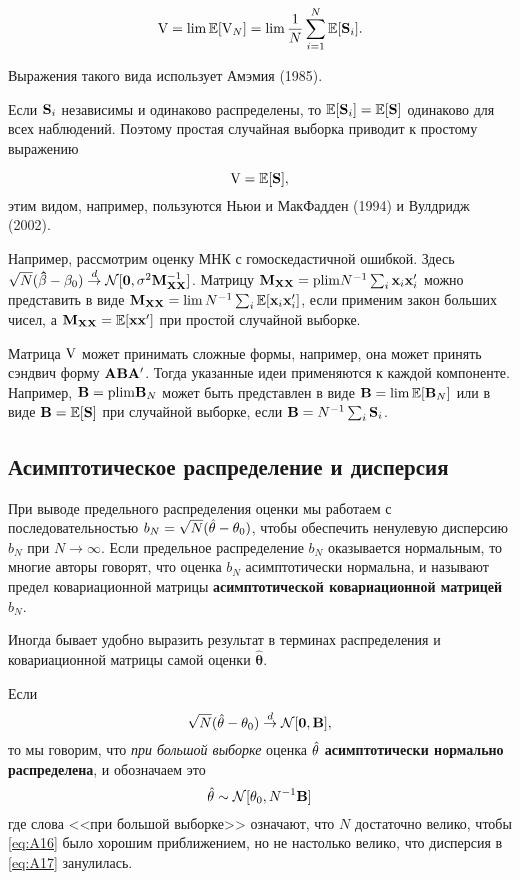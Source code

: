 \[
\mathbf{\mathrm{V}} = \lim \mathbb{E}[\mathbf{\mathrm{V}}_N] = \lim \frac{1}{N} \sum_{i=1}^{N} \mathbb{E}[\mathbf{S}_i].
\]

Выражения такого вида использует Амэмия (1985).

Если $\mathbf{S}_i$ независимы и одинаково распределены, то $\mathbb{E}[\mathbf{S}_i]=\mathbb{E}[\mathbf{S}]$ одинаково для всех наблюдений. Поэтому простая случайная выборка приводит к простому выражению 

\[
\mathbf{\mathrm{V}} = \mathbb{E}[\mathbf{S}],
\]
этим видом, например, пользуются Ньюи и МакФадден (1994) и Вулдридж (2002).

Например, рассмотрим оценку МНК с гомоскедастичной ошибкой. Здесь $\sqrt{N}(\mathbf{\hat{\beta}}-\mathbf{\beta}_0) \overset{d}{\to} \mathcal{N} [\mathbf{0},\sigma^2 \mathbf{M}^{-1}_{\mathbf{XX}}]$. Матрицу $\mathbf{M}_{\mathbf{XX}}=\mathrm{plim } N^{-1} \sum_i \mathbf{x}_i\mathbf{x}_i'$ можно представить в виде $\mathbf{M}_{\mathbf{XX}} = \lim N^{-1} \sum_i \mathbb{E}[\mathbf{x}_i\mathbf{x}_i']$, если применим закон больших чисел, а $\mathbf{M}_{\mathbf{XX}}=\mathbb{E}[\mathbf{x}\mathbf{x}']$ при простой случайной выборке.

Матрица $\mathbf{\mathrm{V}}$ может принимать сложные формы, например, она может принять сэндвич форму $\mathbf{A}\mathbf{B}\mathbf{A}'$. Тогда указанные идеи применяются к каждой компоненте. Например, $\mathbf{B} = \mathrm{plim } \mathbf{B}_N$ может быть представлен в виде $\mathbf{B} = \lim \mathbb{E}[\mathbf{B}_N]$ или в виде $\mathbf{B}=\mathbb{E}[\mathbf{S}]$ при случайной выборке, если $\mathbf{B}=N^{-1}\sum_i \mathbf{S}_i$.

\subsection{Асимптотическое распределение и дисперсия}

При выводе предельного распределения оценки мы работаем с последовательностью $b_N=\sqrt{N}(\hat{\theta}-\theta_0)$, чтобы обеспечить ненулевую дисперсию $b_N$ при $N\to\infty$. Если предельное распределение $b_N$ оказывается нормальным, то многие авторы говорят, что оценка $b_N$ асимптотически нормальна, и называют предел ковариационной матрицы \textbf{асимптотической ковариационной матрицей} $b_N$.

Иногда бывает удобно выразить результат в терминах распределения и ковариационной матрицы самой оценки $\hat{\mathbf{\theta}}$.

\begin{definition}
\label{def:A18}
Если 
\begin{equation}
\label{eq:A16}
\sqrt{N}(\hat{\mathbf{\theta}}-\mathbf{\theta}_0)\overset{d}{\to} \mathcal{N}[\mathbf{0},\mathbf{B}],	
\end{equation}
то мы говорим, что \textit{при большой выборке} оценка $\hat{\mathbf{\theta}}$ \textbf{асимптотически нормально распределена}, и обозначаем это
\begin{equation}
\label{eq:A17}
	\hat{\mathbf{\theta}} \sim \mathcal{N} [\mathbf{\theta}_0,N^{-1}\mathbf{B}]
\end{equation}
где слова <<при большой выборке>> означают, что $N$ достаточно велико, чтобы \ref{eq:A16} было хорошим приближением, но не настолько велико, что дисперсия в \ref{eq:A17} занулилась.
\end{definition}

